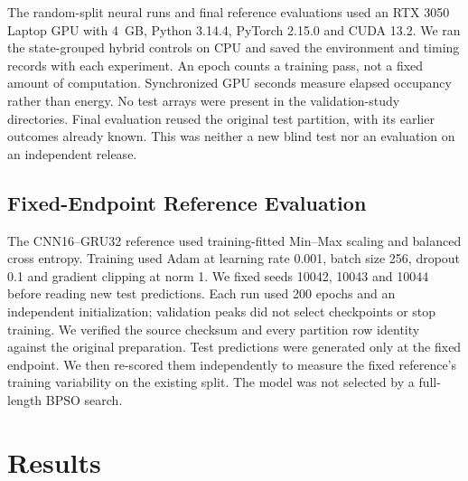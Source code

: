 The random-split neural runs and final reference evaluations used an RTX 3050 Laptop GPU with 4~GB, Python 3.14.4, PyTorch 2.15.0 and CUDA 13.2. We ran the state-grouped hybrid controls on CPU and saved the environment and timing records with each experiment. An epoch counts a training pass, not a fixed amount of computation. Synchronized GPU seconds measure elapsed occupancy rather than energy. No test arrays were present in the validation-study directories. Final evaluation reused the original test partition, with its earlier outcomes already known. This was neither a new blind test nor an evaluation on an independent release.

\subsection{Fixed-Endpoint Reference Evaluation}
The CNN16--GRU32 reference used training-fitted Min--Max scaling and balanced cross entropy. Training used Adam at learning rate 0.001, batch size 256, dropout 0.1 and gradient clipping at norm 1. We fixed seeds 10042, 10043 and 10044 before reading new test predictions. Each run used 200 epochs and an independent initialization; validation peaks did not select checkpoints or stop training. We verified the source checksum and every partition row identity against the original preparation. Test predictions were generated only at the fixed endpoint. We then re-scored them independently to measure the fixed reference's training variability on the existing split. The model was not selected by a full-length BPSO search.

\section{Results}
